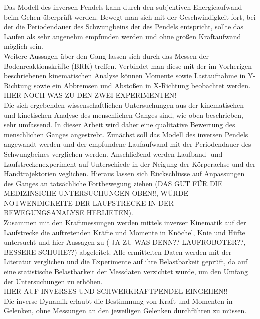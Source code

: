 Das Modell des inversen Pendels kann durch den subjektiven Energieaufwand beim Gehen überprüft werden. Bewegt man sich mit der Geschwindigkeit fort, bei der die Periodendauer des Schwungbeins der des Pendels entspricht, sollte das Laufen als sehr angenehm empfunden werden und ohne großen Kraftaufwand möglich sein.\\
Weitere Aussagen über den Gang lassen sich durch das Messen der Bodenreaktionskräfte (BRK) treffen. Verbindet man diese mit der im Vorherigen beschriebenen kinematischen Analyse können Momente sowie Lastaufnahme in Y-Richtung sowie ein Abbremsen und Abstoßen in X-Richtung beobachtet werden. 
HIER NOCH WAS ZU DEN ZWEI EXPERIMENTEN!\\
Die sich ergebenden wissenschaftlichen Untersuchungen aus der kinematischen und kinetischen Analyse des menschlichen Ganges sind, wie oben beschrieben, sehr umfassend. In dieser Arbeit wird daher eine qualitative Bewertung des menschlichen Ganges angestrebt. Zunächst soll das Modell des inversen Pendels angewandt werden und der empfundene Laufaufwand mit der Periodendauer des Schwungbeines verglichen werden. Anschließend werden Laufband- und Laufstreckenexperiment auf Unterschiede in der Neigung der Körperachse und der Handtrajektorien veglichen. Hieraus lassen sich Rückschlüsse auf Anpassungen des Ganges an tatsächliche Fortbewegung ziehen (DAS GUT FÜR DIE MEDIZINSICHE UNTERSUCHUNGEN OBEN!!, WÜRDE NOTWENDIGKEITE DER LAUFSTRECKE IN DER BEWEGUNGSANALYSE HERLIETEN).\\
Zusammen mit den Kraftmessungen werden mittels inverser Kinematik auf der Laufstrecke die auftretenden Kräfte und Momente in Knöchel, Knie und Hüfte untersucht und hier Aussagen zu ( JA ZU WAS DENN?? LAUFROBOTER??, BESSERE SCHUHE??) abgeleitet. Alle ermittelten Daten werden mit der Literatur verglichen und die Experimente auf ihre Belastbarkeit geprüft, da auf eine statistische Belastbarkeit der Messdaten verzichtet wurde, um den Umfang der Untersuchungen zu erhöhen.\\
HIER AUF INVERSES UND SCHWERKRAFTPENDEL EINGEHEN!!\\

Die inverse Dynamik erlaubt die Bestimmung von Kraft und Momenten in Gelenken, ohne Messungen an den jeweiligen Gelenken durchführen zu müssen.